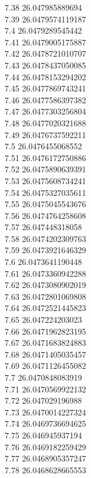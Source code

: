 {7.38	26.047985889694\\
7.39	26.0479574119187\\
7.4	26.0479289545442\\
7.41	26.0479005175887\\
7.42	26.0478721010707\\
7.43	26.0478437050085\\
7.44	26.0478153294202\\
7.45	26.0477869743241\\
7.46	26.0477586397382\\
7.47	26.0477303256804\\
7.48	26.0477020321688\\
7.49	26.0476737592211\\
7.5	26.0476455068552\\
7.51	26.0476172750886\\
7.52	26.0475890639391\\
7.53	26.0475608734241\\
7.54	26.0475327035611\\
7.55	26.0475045543676\\
7.56	26.0474764258608\\
7.57	26.047448318058\\
7.58	26.0474202309763\\
7.59	26.0473921646329\\
7.6	26.0473641190448\\
7.61	26.0473360942288\\
7.62	26.0473080902019\\
7.63	26.0472801069808\\
7.64	26.0472521445823\\
7.65	26.047224203023\\
7.66	26.0471962823195\\
7.67	26.0471683824883\\
7.68	26.0471405035457\\
7.69	26.0471126455082\\
7.7	26.0470848083919\\
7.71	26.0470569922132\\
7.72	26.047029196988\\
7.73	26.0470014227324\\
7.74	26.0469736694625\\
7.75	26.046945937194\\
7.76	26.0469182259429\\
7.77	26.0468905357247\\
7.78	26.0468628665553\\
}
